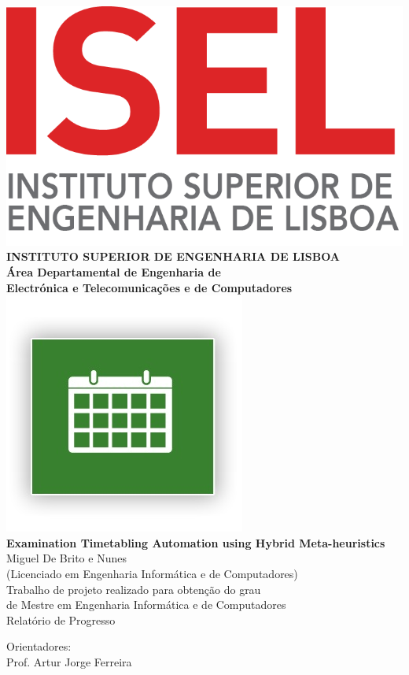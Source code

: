 \begin{titlepage}
	\thispagestyle{empty}
	\begin{center}
		\includegraphics[width=7 cm]{./images/LogoIsel3.png} \\[0.5cm]
		{\Large \textbf{INSTITUTO SUPERIOR DE ENGENHARIA DE LISBOA}} \\[0.5cm]
		{\Large \textbf{Área Departamental de Engenharia de \\Electrónica e Telecomunica\c cões e de Computadores}} \\[0.8cm]		
		\includegraphics[height=3.5 cm]{./images/guide_me_logo.jpg} \\[0.8cm]
		\fontsize{18pt}{10pt}\selectfont
		{\textbf{Examination Timetabling Automation using Hybrid Meta-heuristics}} \\[0.8cm]
		\fontsize{16pt}{10pt}\selectfont
		Miguel De Brito e Nunes\\[0.2cm]
		\fontsize{14pt}{10pt}\selectfont
		(Licenciado em Engenharia Informática e de Computadores)\\[0.8cm]
		\fontsize{12pt}{10pt}\selectfont
		{Trabalho de projeto realizado para obten\c cão do grau\\de Mestre em Engenharia Informática e de Computadores} \\[0.8cm]
		\fontsize{16pt}{10pt}\selectfont
		Relatório de Progresso
		\vfill
		\begin{tabbing}
		   \fontsize{12pt}{10pt}\selectfont
		   Orientadores: \\
		   \fontsize{11pt}{10pt}\selectfont
		   \hspace{1.1cm}Prof. Artur Jorge Ferreira \\
		   \fontsize{11pt}{10pt}\selectfont

\end{tabbing}
\end{center}
\end{titlepage}
